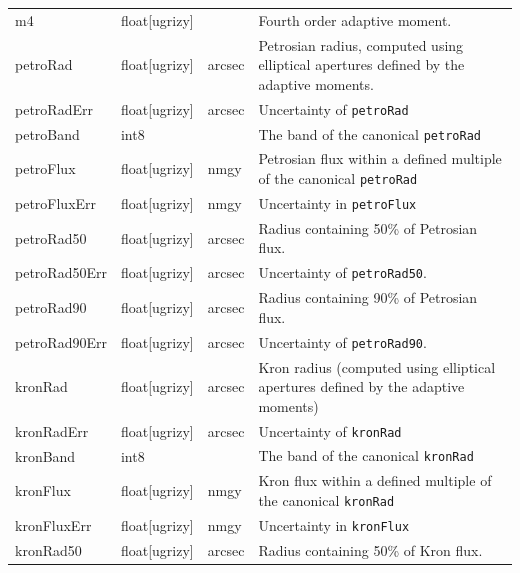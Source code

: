 \documentclass[12pt]{article}
\begin{document}
\begin{center}
\begin{longtable}{p{3cm}p{2cm}p{2cm}p{5cm}}
m4 & float[ugrizy] & ~ & Fourth order adaptive moment. \\


petroRad & float[ugrizy] & arcsec & Petrosian radius, computed using elliptical apertures defined by the adaptive moments. \\

petroRadErr & float[ugrizy] & arcsec & Uncertainty of {\tt petroRad} \\

petroBand & int8 & ~ & The band of the canonical {\tt petroRad} \\

petroFlux & float[ugrizy] & nmgy & Petrosian flux within a defined multiple of the canonical {\tt petroRad} \\

petroFluxErr & float[ugrizy] & nmgy & Uncertainty in {\tt petroFlux} \\

petroRad50 & float[ugrizy] & arcsec & Radius containing 50\% of Petrosian flux. \\

petroRad50Err & float[ugrizy] & arcsec & Uncertainty of {\tt petroRad50}. \\

petroRad90 & float[ugrizy] & arcsec & Radius containing 90\% of Petrosian flux. \\

petroRad90Err & float[ugrizy] & arcsec & Uncertainty of {\tt petroRad90}. \\


kronRad & float[ugrizy] & arcsec & Kron radius (computed using elliptical apertures defined by the adaptive moments) \\

kronRadErr & float[ugrizy] & arcsec & Uncertainty of {\tt kronRad} \\

kronBand & int8 & ~ & The band of the canonical {\tt kronRad} \\

kronFlux & float[ugrizy] & nmgy & Kron flux within a defined multiple of the canonical {\tt kronRad} \\

kronFluxErr & float[ugrizy] & nmgy & Uncertainty in {\tt kronFlux} \\

kronRad50 & float[ugrizy] & arcsec & Radius containing 50\% of Kron flux. \\


\end{longtable}
\end{center}
\end{document}
